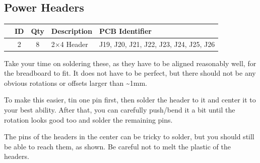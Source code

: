 \documentclass[12pt, a4paper]{article}
\newcommand{\checkbox}[1]{\CheckBox[backgroundcolor=0.86 0.828 0.71, name=#1]{}}
\begin{document}
\pagebreak

\subsection{Power Headers}

\begin{center}
    \small
    \setlength\extrarowheight{8pt}
    \begin{tabularx}{\textwidth}{|c|c|c|X|l|}
        \hline\rowcolor{lightgray} & ID & Qty & Description & PCB Identifier\\
        \hline\checkbox{fa} & 2 & 8 & 2×4 Header & J19, J20, J21, J22, J23, J24, J25, J26\\
        \hline
    \end{tabularx}
\end{center}

Take your time on soldering these, as they have to be aligned reasonably well, for the
breadboard to fit. It does not have to be perfect, but there should not be any obvious
rotations or offsets larger than \textasciitilde1mm.

To make this easier, tin one pin first, then solder the header to it and center it to your best
ability. After that, you can carefully push/bend it a bit until the rotation looks good too and
solder the remaining pins.

The pins of the headers in the center can be tricky to solder, but you should still be able to
reach them, as shown. Be careful not to melt the plastic of the headers.
\end{document}
